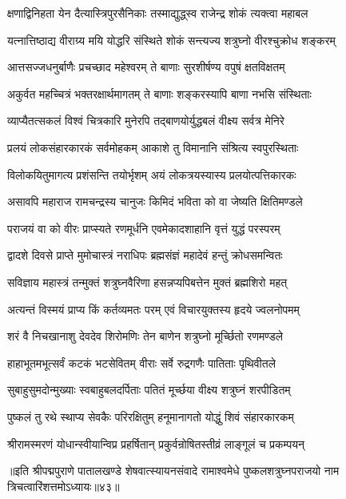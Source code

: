\twolineshloka
{क्षणाद्विनिहता येन दैत्यास्त्रिपुरसैनिकाः}
{तस्माद्युद्ध्स्व राजेन्द्र शोकं त्यक्त्वा महाबल}%

\twolineshloka
{यत्नात्तिष्ठाद्य वीराग्र्य मयि योद्धरि संस्थिते}
{शोकं सन्त्यज्य शत्रुघ्नो वीरश्चुक्रोध शङ्करम्}%

\twolineshloka
{आत्तसज्जधनुर्बाणैः प्रचच्छाद महेश्वरम्}
{ते बाणाः सुरशीर्षण्य वपुषं क्षतविक्षतम्}%

\twolineshloka
{अकुर्वत महच्चित्रं भक्तरक्षार्थमागतम्}
{ते बाणाः शङ्करस्यापि बाणा नभसि संस्थिताः}%

\twolineshloka
{व्याप्यैतत्सकलं विश्वं चित्रकारि मुनेरपि}
{तद्बाणयोर्युद्धबलं वीक्ष्य सर्वत्र मेनिरे}%

\twolineshloka
{प्रलयं लोकसंहारकारकं सर्वमोहकम्}
{आकाशे तु विमानानि संश्रित्य स्वपुरस्थिताः}%

\twolineshloka
{विलोकयितुमागत्य प्रशंसन्ति तयोर्भृशम्}
{अयं लोकत्रयस्यास्य प्रलयोत्पत्तिकारकः}%

\twolineshloka
{असावपि महाराज रामचन्द्रस्य चानुजः}
{किमिदं भविता को वा जेष्यति क्षितिमण्डले}%

\twolineshloka
{पराजयं वा को वीरः प्राप्स्यते रणमूर्धनि}
{एवमेकादशाहानि वृत्तं युद्धं परस्परम्}%

\twolineshloka
{द्वादशे दिवसे प्राप्ते मुमोचास्त्रं नराधिपः}
{ब्रह्मसंज्ञं महादेवं हन्तुं क्रोधसमन्वितः}%

\twolineshloka
{सविज्ञाय महास्त्रं तन्मुक्तं शत्रुघ्नवैरिणा}
{हसन्नप्यपिबत्तेन मुक्तं ब्रह्मशिरो महत्}%

\twolineshloka
{अत्यन्तं विस्मयं प्राप्य किं कर्तव्यमतः परम्}
{एवं विचारयुक्तस्य हृदये ज्वलनोपमम्}%

\twolineshloka
{शरं वै निचखानाशु देवदेव शिरोमणिः}
{तेन बाणेन शत्रुघ्नो मूर्च्छितो रणमण्डले}%

\twolineshloka
{हाहाभूतमभूत्सर्वं कटकं भटसेवितम्}
{वीराः सर्वे रुद्रगणैः पातिताः पृथिवीतले}%

\twolineshloka
{सुबाहुसुमदोन्मुख्याः स्वबाहुबलदर्पिताः}
{पतितं मूर्च्छया वीक्ष्य शत्रुघ्नं शरपीडितम्}%

\twolineshloka
{पुष्कलं तु रथे स्थाप्य सेवकैः परिरक्षितुम्}
{हनूमानागतो योद्धुं शिवं संहारकारकम्}%

\twolineshloka
{श्रीरामस्मरणं योधान्स्वीयान्विप्र प्रहर्षितान्}
{प्रकुर्वन्रोषितस्तीव्रं लाङ्गूलं च प्रकम्पयन्}%

{॥इति श्रीपद्मपुराणे पातालखण्डे शेषवात्स्यायनसंवादे रामाश्वमेधे पुष्कलशत्रुघ्नपराजयो नाम त्रिचत्वारिंशत्तमोऽध्यायः॥४३॥}

